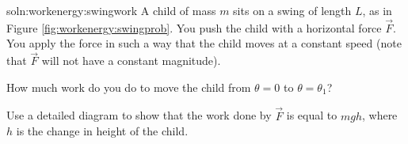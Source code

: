 \begin{problemParts}{soln:workenergy:swingwork}{\label{prob:workenergy:swingwork}
A child of mass $m$ sits on a swing of length $L$, as in Figure \ref{fig:workenergy:swingprob}. You push the child with a horizontal force $\vec F$. You apply the force in such a way that the child moves at a constant speed (note that $\vec F$ will not have a constant magnitude).}
\item How much work do you do to move the child from $\theta=0$ to $\theta=\theta_1$? 
\item Use a detailed diagram to show that the work done by $\vec F$ is equal to $mgh$, where $h$ is the change in height of the child. 
\end{problemParts}

\newpage
